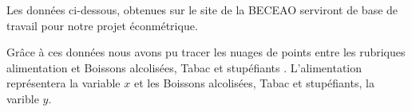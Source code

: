 \documentclass[12pt]{book}
\begin{document}
Les données ci-dessous, obtenues sur le site de la BECEAO serviront de base de travail pour notre projet éconmétrique.



Grâce à ces données nous avons pu tracer les nuages de points entre les rubriques \guillemetleft alimentation \guillemetright et \guillemetleft Boissons alcolisées, Tabac et stupéfiants \guillemetright. L'alimentation représentera la variable $x$ et les Boissons alcolisées, Tabac et stupéfiants, la varible $y$.


\end{document}
